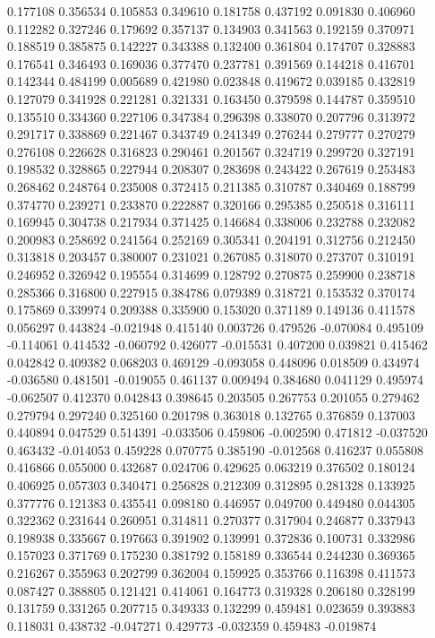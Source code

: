 0.177108
0.356534
0.105853
0.349610
0.181758
0.437192
0.091830
0.406960
0.112282
0.327246
0.179692
0.357137
0.134903
0.341563
0.192159
0.370971
0.188519
0.385875
0.142227
0.343388
0.132400
0.361804
0.174707
0.328883
0.176541
0.346493
0.169036
0.377470
0.237781
0.391569
0.144218
0.416701
0.142344
0.484199
0.005689
0.421980
0.023848
0.419672
0.039185
0.432819
0.127079
0.341928
0.221281
0.321331
0.163450
0.379598
0.144787
0.359510
0.135510
0.334360
0.227106
0.347384
0.296398
0.338070
0.207796
0.313972
0.291717
0.338869
0.221467
0.343749
0.241349
0.276244
0.279777
0.270279
0.276108
0.226628
0.316823
0.290461
0.201567
0.324719
0.299720
0.327191
0.198532
0.328865
0.227944
0.208307
0.283698
0.243422
0.267619
0.253483
0.268462
0.248764
0.235008
0.372415
0.211385
0.310787
0.340469
0.188799
0.374770
0.239271
0.233870
0.222887
0.320166
0.295385
0.250518
0.316111
0.169945
0.304738
0.217934
0.371425
0.146684
0.338006
0.232788
0.232082
0.200983
0.258692
0.241564
0.252169
0.305341
0.204191
0.312756
0.212450
0.313818
0.203457
0.380007
0.231021
0.267085
0.318070
0.273707
0.310191
0.246952
0.326942
0.195554
0.314699
0.128792
0.270875
0.259900
0.238718
0.285366
0.316800
0.227915
0.384786
0.079389
0.318721
0.153532
0.370174
0.175869
0.339974
0.209388
0.335900
0.153020
0.371189
0.149136
0.411578
0.056297
0.443824
-0.021948
0.415140
0.003726
0.479526
-0.070084
0.495109
-0.114061
0.414532
-0.060792
0.426077
-0.015531
0.407200
0.039821
0.415462
0.042842
0.409382
0.068203
0.469129
-0.093058
0.448096
0.018509
0.434974
-0.036580
0.481501
-0.019055
0.461137
0.009494
0.384680
0.041129
0.495974
-0.062507
0.412370
0.042843
0.398645
0.203505
0.267753
0.201055
0.279462
0.279794
0.297240
0.325160
0.201798
0.363018
0.132765
0.376859
0.137003
0.440894
0.047529
0.514391
-0.033506
0.459806
-0.002590
0.471812
-0.037520
0.463432
-0.014053
0.459228
0.070775
0.385190
-0.012568
0.416237
0.055808
0.416866
0.055000
0.432687
0.024706
0.429625
0.063219
0.376502
0.180124
0.406925
0.057303
0.340471
0.256828
0.212309
0.312895
0.281328
0.133925
0.377776
0.121383
0.435541
0.098180
0.446957
0.049700
0.449480
0.044305
0.322362
0.231644
0.260951
0.314811
0.270377
0.317904
0.246877
0.337943
0.198938
0.335667
0.197663
0.391902
0.139991
0.372836
0.100731
0.332986
0.157023
0.371769
0.175230
0.381792
0.158189
0.336544
0.244230
0.369365
0.216267
0.355963
0.202799
0.362004
0.159925
0.353766
0.116398
0.411573
0.087427
0.388805
0.121421
0.414061
0.164773
0.319328
0.206180
0.328199
0.131759
0.331265
0.207715
0.349333
0.132299
0.459481
0.023659
0.393883
0.118031
0.438732
-0.047271
0.429773
-0.032359
0.459483
-0.019874
